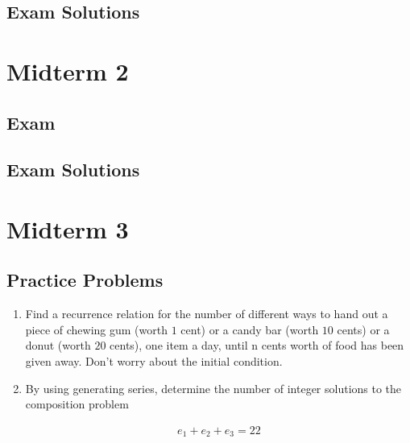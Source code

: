 \documentclass{report}
\begin{document}
{\subsection{Exam Solutions}

\section{Midterm 2}

\subsection{Exam}

\subsection{Exam Solutions}

\section{Midterm 3}

\subsection{Practice Problems}

\begin{enumerate}
    \item Find a recurrence relation for the number of different ways to hand
          out a piece of chewing gum (worth $1$ cent) or a candy bar (worth $10$
          cents) or a donut (worth $20$ cents), one item a day, until n cents worth
          of food has been given away. Don’t worry about the initial condition.

    \item  By using generating series, determine the number of integer solutions
          to the composition problem

          \begin{align*}
              e_1 + e_2 + e_3 = 22
          \end{align*}


\end{enumerate}}
\end{document}
